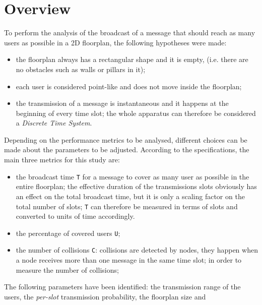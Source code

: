 %
\chapter{Overview}\label{ch:overview}
To perform the analysis of the broadcast of a message that should reach as many
users as possible in a 2D floorplan, the following hypotheses were made:
\begin{itemize}
	\item the floorplan always has a rectangular shape and it is empty, (i.e.
	there are no obstacles such as walls or pillars in it);
	\item each user is considered point-like and does not move inside the
	floorplan;
	\item the transmission of a message is instantaneous and it happens at the
	beginning of every time slot; the whole apparatus can therefore be
	considered a \textit{Discrete Time System}.
\end{itemize}
Depending on the performance metrics to be analysed, different choices can be
made about the parameters to be adjusted. According to the specifications, the
main three metrics for this study are:
\begin{itemize}
	\item the broadcast time \colorbox{gray!30}{\large \texttt{T}} for a message
	to cover as many user as possible in the entire floorplan; the effective
	duration of the transmissions slots obviously has an effect
	on the total broadcast time, but it is only a scaling factor on the total
	number of slots; \texttt{T} can therefore be measured in terms of slots and
	converted to units of time accordingly.
	\item the percentage of covered users \colorbox{gray!30}{\large \texttt{U}};
	\item the number of collisions \colorbox{gray!30}{\large \texttt{C}}:
	collisions are detected by nodes, they happen when a node receives more than
	one message in the same time slot; in order to measure the number of
	collisions;
\end{itemize}
The following parameters have been identified: the transmission range of the
users, the \textit{per-slot} transmission probability, the floorplan size and
